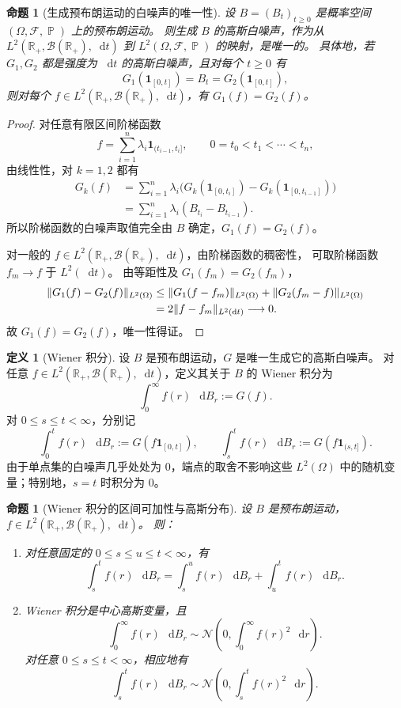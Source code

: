\documentclass[UTF8,11pt,a4paper,oneside,fontset=fandol]{ctexrep}
\numberwithin{equation}{section}
\theoremstyle{plain}
\newtheorem{proposition}[theorem]{命题}
\theoremstyle{definition}
\newtheorem{definition}[theorem]{定义}
\theoremstyle{remark}
\newcommand{\R}{\mathbb{R}}
\newcommand{\B}{\mathcal{B}}
\newcommand{\F}{\mathcal{F}}
\DeclareMathOperator{\Prob}{\mathbb{P}}
\newcommand{\ind}[1]{\mathbf{1}_{#1}}
\newcommand{\dd}{\mathop{}\!\mathrm{d}}
\DeclarePairedDelimiter{\norm}{\lVert}{\rVert}
\begin{document}
\begin{proposition}[生成预布朗运动的白噪声的唯一性]
\label{prop:pre-brownian-white-noise-uniqueness}
设 $B=(B_t)_{t\ge0}$ 是概率空间 $(\Omega,\F,\Prob)$ 上的预布朗运动。
则生成 $B$ 的高斯白噪声，作为从 $L^2(\R_+,\B(\R_+),\dd t)$ 到
$L^2(\Omega,\F,\Prob)$ 的映射，是唯一的。
具体地，若 $G_1,G_2$ 都是强度为 $\dd t$ 的高斯白噪声，且对每个 $t\ge0$ 有
\[
  G_1(\ind{[0,t]})=B_t=G_2(\ind{[0,t]}),
\]
则对每个 $f\in L^2(\R_+,\B(\R_+),\dd t)$，有 $G_1(f)=G_2(f)$。
\end{proposition}

\begin{proof}
对任意有限区间阶梯函数
\[
  f=\sum_{i=1}^{n}\lambda_i\ind{(t_{i-1},t_i]},
  \qquad 0=t_0<t_1<\cdots<t_n,
\]
由线性性，对 $k=1,2$ 都有
\begin{align*}
  G_k(f)
  &=\sum_{i=1}^{n}\lambda_i
       \bigl(G_k(\ind{[0,t_i]})-G_k(\ind{[0,t_{i-1}]})\bigr)\\
  &=\sum_{i=1}^{n}\lambda_i(B_{t_i}-B_{t_{i-1}}).
\end{align*}
所以阶梯函数的白噪声取值完全由 $B$ 确定，$G_1(f)=G_2(f)$。

对一般的 $f\in L^2(\R_+,\B(\R_+),\dd t)$，由阶梯函数的稠密性，
可取阶梯函数 $f_m\to f$ 于 $L^2(\dd t)$。
由等距性及 $G_1(f_m)=G_2(f_m)$，
\begin{align*}
  \norm{G_1(f)-G_2(f)}_{L^2(\Omega)}
  &\le\norm{G_1(f-f_m)}_{L^2(\Omega)}
       +\norm{G_2(f_m-f)}_{L^2(\Omega)}\\
  &=2\norm{f-f_m}_{L^2(\dd t)}\longrightarrow0.
\end{align*}
故 $G_1(f)=G_2(f)$，唯一性得证。
\end{proof}

\begin{definition}[Wiener 积分]
\label{def:wiener-integral}
设 $B$ 是预布朗运动，$G$ 是唯一生成它的高斯白噪声。
对任意 $f\in L^2(\R_+,\B(\R_+),\dd t)$，定义其关于 $B$ 的
Wiener 积分为
\[
  \int_0^\infty f(r)\,\dd B_r:=G(f).
\]
对 $0\le s\le t<\infty$，分别记
\[
  \int_0^t f(r)\,\dd B_r:=G(f\ind{[0,t]}),
  \qquad
  \int_s^t f(r)\,\dd B_r:=G(f\ind{(s,t]}).
\]
由于单点集的白噪声几乎处处为 $0$，端点的取舍不影响这些 $L^2(\Omega)$ 中的随机变量；特别地，$s=t$ 时积分为 $0$。
\end{definition}

\begin{proposition}[Wiener 积分的区间可加性与高斯分布]
\label{prop:wiener-integral-additivity-law}
设 $B$ 是预布朗运动，$f\in L^2(\R_+,\B(\R_+),\dd t)$。
则：
\begin{enumerate}[label=(\arabic*)]
  \item 对任意固定的 $0\le s\le u\le t<\infty$，有
    \[
      \int_s^t f(r)\,\dd B_r
      =\int_s^u f(r)\,\dd B_r+\int_u^t f(r)\,\dd B_r.
    \]
  \item Wiener 积分是中心高斯变量，且
    \[
      \int_0^\infty f(r)\,\dd B_r
      \sim\mathcal{N}\!\left(0,\int_0^\infty f(r)^2\,\dd r\right).
    \]
    对任意 $0\le s\le t<\infty$，相应地有
    \[
      \int_s^t f(r)\,\dd B_r
      \sim\mathcal{N}\!\left(0,\int_s^t f(r)^2\,\dd r\right).
    \]
\end{enumerate}
\end{proposition}
\end{document}
